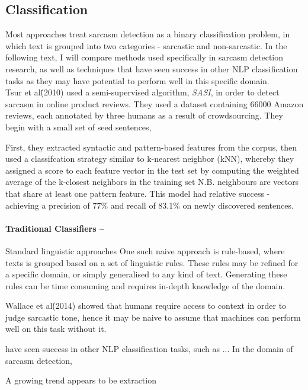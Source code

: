 \documentclass[12pt,a4paper]{article}
\begin{document}
\subsection{Classification}
\noindent Most approaches treat sarcasm detection as a binary classification problem, in which text is grouped into two categories - sarcastic and non-sarcastic. In the following text, I will compare methods used specifically in sarcasm detection research, as well as techniques that have seen success in other NLP classification tasks as they may have potential to perform well in this specific domain. \\

Tsur et al\. (2010) \cite{tsur2010icwsm} used a semi-supervised algorithm, \textit{SASI}, in order to detect sarcasm in online product reviews.  They used a dataset containing 66000 Amazon reviews, each annotated by three humans as a result of crowdsourcing. They begin with a small set of seed sentences, 


First, they extracted syntactic and pattern-based features from the corpus, then used a classifcation strategy similar to k-nearest neighbor (kNN), whereby they assigned a score to each feature vector in the test set by computing the weighted average of the k-closest neighbors in the training set N.B. neighbours are vectors that share at least one pattern feature. This model had relative success - achieving a precision of 77\% and recall of 83.1\% on newly discovered sentences.




\paragraph{Traditional Classifiers --}
Standard linguistic approaches
One such naive approach is rule-based, where texts is grouped based on a set of linguistic rules. These rules may be refined for a specific domain, or simply generalised to any kind of text. Generating these rules can be time consuming and requires in-depth knowledge of the domain. 


Wallace et al\.(2014) showed that humans require access to context in order to judge sarcastic tone, hence it may be naive to assume that machines can perform well on this task without it. 

have seen success in other NLP classification tasks, such as ... In the domain of sarcasm detection, 

A growing trend appears to be extraction 
\end{document}
